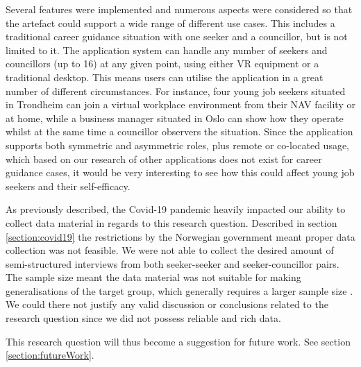 Several features were implemented and numerous aspects were considered so that the artefact could support a wide range of different use cases. This includes a traditional career guidance situation with one seeker and a councillor, but is not limited to it. The application system can handle any number of seekers and councillors (up to 16) at any given point, using either VR equipment or a traditional desktop. This means users can utilise the application in a great number of different circumstances. For instance, four young job seekers situated in Trondheim can join a virtual workplace environment from their NAV facility or at home, while a business manager situated in Oslo can show how they operate whilst at the same time a councillor observers the situation.           
Since the application supports both symmetric and asymmetric roles, plus remote or co-located usage, which based on our research of other applications does not exist for career guidance cases, it would be very interesting to see how this could affect young job seekers and their self-efficacy. 


As previously described, the Covid-19 pandemic heavily impacted our ability to collect data material in regards to this research question. Described in section \ref{section:covid19} the restrictions by the Norwegian government meant proper data collection was not feasible. We were not able to collect the desired amount of semi-structured interviews from both seeker-seeker and seeker-councillor pairs. The sample size meant the data material was not suitable for making generalisations of the target group, which generally requires a larger sample size \cite{oates2005researching}. We could there not justify any valid discussion or conclusions related to the research question since we did not possess reliable and rich data.                

This research question will thus become a suggestion for future work. See section \ref{section:futureWork}.  






